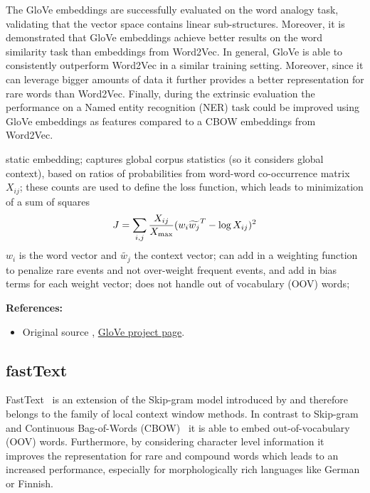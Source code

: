 \documentclass[11pt, a4paper]{amsart}
\begin{document}
The GloVe embeddings are successfully evaluated on the word analogy task, validating that the vector space contains linear sub-structures. Moreover, it is demonstrated that GloVe embeddings achieve better results on the word similarity task than embeddings from Word2Vec. In general, GloVe is able to consistently outperform Word2Vec in a similar training setting. Moreover, since it can leverage bigger amounts of data it further provides a better representation for rare words than Word2Vec. Finally, during the extrinsic evaluation the performance on a Named entity recognition (NER) task could be improved using GloVe embeddings as features compared to a CBOW embeddings from Word2Vec.

{
	\color{blue}
		
	static embedding;
	captures global corpus statistics (so it considers global context), based on ratios of probabilities from word-word co-occurrence matrix $X_{ij}$;
	these counts are used to define the loss function, which leads to minimization of a sum of squares
	\begin{equation*}
	    J = \sum_{i, j} \frac{X_{ij}}{X_{\textup{max}}}
	    (w_{i} \widetilde{w_{j}}^{T} - \log X_{ij})^{2}
	\end{equation*}
	$w_{i}$ is the word vector and $\widetilde{w_{j}}$ the context vector;
	can add in a weighting function to penalize rare events and not over-weight frequent events, and add in bias terms for each weight vector;
	does not handle out of vocabulary (OOV) words;
}

\noindent \textbf{References:}
\begin{itemize}
	\item Original source \cite{pennington-etal-2014-glove},
	\href{https://nlp.stanford.edu/projects/glove/}{GloVe project page}.
\end{itemize}

\subsection{fastText}

FastText~\cite{DBLP:journals/corr/BojanowskiGJM16} is an extension of the Skip-gram model introduced by \cite{DBLP:journals/corr/MikolovSCCD13} and therefore belongs to the family of local context window methods. In contrast to Skip-gram and Continuous Bag-of-Words (CBOW)~\cite{DBLP:journals/corr/MikolovSCCD13} it is able to embed out-of-vocabulary (OOV) words. Furthermore, by considering character level information it improves the representation for rare and compound words which leads to an increased performance, especially for morphologically rich languages like German or Finnish.\\
\end{document}
